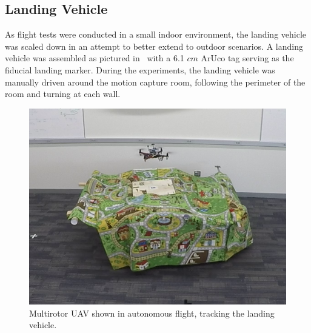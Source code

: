 
\subsection{Landing Vehicle}
As flight tests were conducted in a small indoor environment, the landing
vehicle was scaled down in an attempt to better extend to outdoor scenarios. A
landing vehicle was assembled as pictured in~ with a
6.1 $cm$ ArUco tag serving as the fiducial landing marker.
During the experiments, the landing vehicle was manually driven around the
motion capture room, following the perimeter of the room and turning at each
wall.

\begin{figure}
  \centering
  \includegraphics[scale=0.5]{imgs/landing_vehicle.png}
  \caption{Multirotor UAV shown in autonomous flight, tracking the landing
  vehicle.}
  \label{fig:landing_vehicle}
\end{figure}
